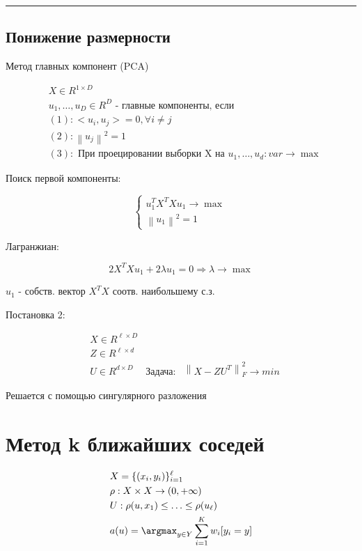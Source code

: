 \documentclass[a4paper, 12pt]{article}
\newcommand\norm[1]{\left\lVert#1\right\rVert}
\begin{document}
\rule{\linewidth}{0.5pt}

\subsection{Понижение размерности}

Метод главных компонент (PCA)

\begin{align*}
    & X \in R^{1\times D}\\
    & u_1, \ldots, u_D \in R^D \textrm{ - главные компоненты, если} \\
    &(1): <u_i, u_j> = 0, \forall i \neq j \\
    &(2): \norm{u_j}^2 = 1 \\
    &(3): \textrm{ При проецировании выборки X на } u_1, \ldots, u_d:
    var \rightarrow \max
\end{align*}

Поиск первой компоненты:

\[\begin{cases}
    u_1^T X^T X u_1 \rightarrow \max\\
    \norm{u_1}^2 = 1
\end{cases}\]

Лагранжиан:

\[2X^TX u_1 + 2\lambda u_1 = 0 \Rightarrow 
\lambda \rightarrow \max\]

$u_1$ - собств. вектор $X^TX$ соотв. наибольшему с.з.

Постановка 2:

\begin{align*}
    & X \in R^{\ell \times D} \\
    & Z \in R^{\ell \times d} \\
    & U \in R^{d \times D}

    & \textrm{Задача:}

    & \norm{X - ZU^T}_F^2 \rightarrow min
\end{align*}

Решается с помощью сингулярного разложения

\section{Метод k ближайших соседей}

\begin{align*}
    & X = \{(x_i, y_i)\}_{i = 1}^{\ell} \\
    & \rho: X \times X \rightarrow (0, +\infty) \\
    & U: \rho(u, x_1) \leq \ldots \leq \rho(u_{\ell}) \\
    & a(u) = \argmax_{y \in Y} \sum_{i = 1}^{K} w_i [y_i = y] 
\end{align*}
\end{document}

